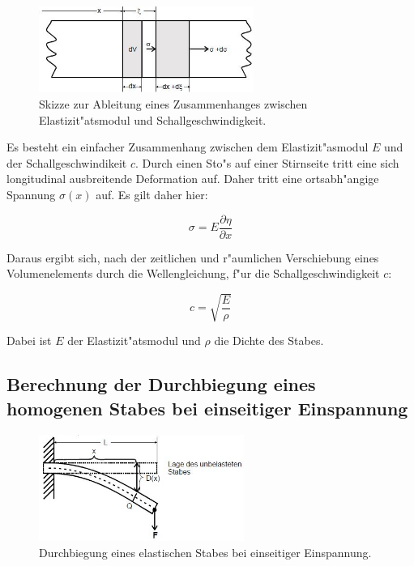 \begin{figure}[!h]
\centering
\includegraphics[width = 7cm]{img/schall.JPG}
\caption{Skizze zur Ableitung eines Zusammenhanges zwischen Elastizit"atsmodul und Schallgeschwindigkeit. \cite{anleitung}}
\label{fg:schall}
\end{figure}

Es besteht ein einfacher Zusammenhang zwischen dem Elastizit"asmodul $E$ und der Schallgeschwindikeit $c$. Durch einen Sto"s auf einer Stirnseite tritt eine sich longitudinal ausbreitende Deformation auf. Daher tritt eine ortsabh"angige Spannung $\sigma(x)$ auf. Es gilt daher hier:

\begin{equation}
\sigma = E \frac{\partial \eta}{\partial x}
\end{equation}

Daraus ergibt sich, nach der zeitlichen und r"aumlichen Verschiebung eines Volumenelements durch die Wellengleichung, f"ur die Schallgeschwindigkeit $c$:

\begin{equation}
c = \sqrt{\frac{E}{\rho}}
\end{equation}

Dabei ist $E$ der Elastizit"atsmodul und $\rho$ die Dichte des Stabes.

\subsection{Berechnung der Durchbiegung eines homogenen Stabes bei einseitiger Einspannung} %
\label{sub:1}

\begin{figure}
\centering
\includegraphics[width = 6.7cm]{img/biegung.JPG}
\caption{Durchbiegung eines elastischen Stabes bei einseitiger Einspannung. \cite{anleitung}}
\label{fg:biegung}
\end{figure}


